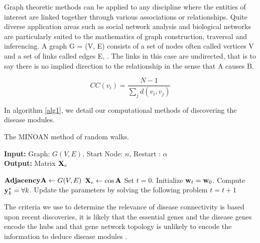 \documentclass[a4paper,8pt,twocolumn,5p]{elsarticle}
\begin{document}
Graph theoretic methods can be applied to any discipline where the entities of interest are linked together through various associations or relationships.  Quite diverse application areas such as social network analysis and biological networks are particularly suited to the mathematics of graph construction, traversal and inferencing. A graph G = (V, E) consists of a set of nodes often called vertices V and a set of links called edges E, . The links in this case are undirected, that is to say there is no implied direction to the relationship in the sense that A causes B.

\begin{equation}\label{closeness}
     CC(v_i) =  \frac{N - 1}{\sum_{j} d(v_i,v_j)}
\end{equation}

In algorithm \ref{alg1}, we detail our computational  methods of discovering the disease modules.

\begin{algorithm}
\scriptsize
\caption{\label{alg1} The MINOAN method of random walks.}
\textbf{Input:} Graph: $G(V,E)$, Start Node: $n$, Restart : $\alpha$\\
\textbf{Output:} Matrix  ${\bf X}_c$
\begin{algorithmic}[1]

\State ${\bf Adjacency A}   \gets G(V,E)$
\State ${\bf X}_c \gets \cos {\bf A}$
\State Set $t=0$. Initialize ${\bf w}_t = {\bf w}_0$.
\Repeat 
\State Compute ${\bf y}_k^* =  \forall k$.
\State Update the parameters by solving the following problem
\State $t=t+1$
\end{algorithmic}
\end{algorithm}

The criteria we use to determine the relevance of disease connectivity is based upon recent discoveries,   it is likely that the essential genes and the disease genes encode the hubs \citep{Vidal2011} and that gene network topology is unlikely to encode the information to deduce disease modules \citep{Ghiassian2015}. 
\end{document}
